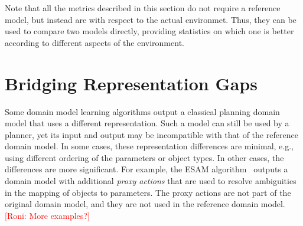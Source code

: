 \documentclass{article}
\theoremstyle{definition}
\theoremstyle{remark}
\newcommand{\roni}[1]{{\textcolor{red}{[Roni: #1]}}}
\begin{document}

Note that all the metrics described in this section do not require a reference model, but instead are with respect to the actual environmet. Thus, they can be used to compare two models directly,  providing statistics on which one is better according to different aspects of the environment. 







\section{Bridging Representation Gaps}
\label{sec:bridging-gap}
Some domain model learning algorithms output a classical planning domain model that uses a different representation. Such a model can still be used by a planner, yet its input and output may be incompatible with that of the reference domain model. 
In some cases, these representation differences are minimal, e.g., using  different ordering of the parameters or object types. 
In other cases, the differences are more significant. 
For example, the ESAM algorithm~\citep{juba2021safe} outputs a domain model with additional \emph{proxy actions} that are used to resolve ambiguities in the mapping of objects to parameters.
The proxy actions are not part of the original domain model, and they are not used in the reference domain model. 
\roni{More examples?}
\end{document}
